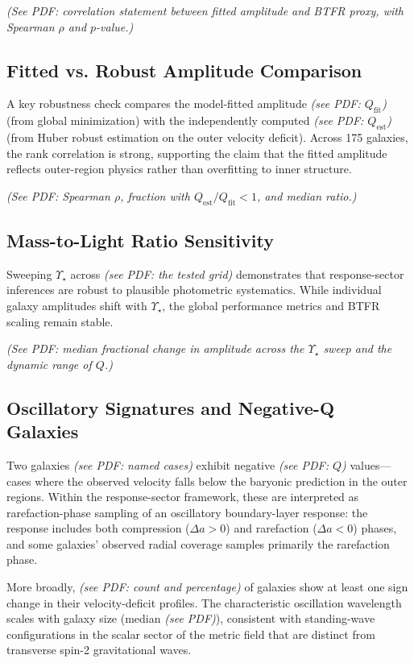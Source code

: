 \emph{(See PDF: correlation statement between fitted amplitude and BTFR proxy, with Spearman $\rho$ and $p$-value.)}

\subsection{Fitted vs. Robust Amplitude Comparison}
A key robustness check compares the model-fitted amplitude \emph{(see PDF: $Q_{\mathrm{fit}}$)} (from global minimization) with the independently computed \emph{(see PDF: $Q_{\mathrm{est}}$)} (from Huber robust estimation on the outer velocity deficit). Across 175 galaxies, the rank correlation is strong, supporting the claim that the fitted amplitude reflects outer-region physics rather than overfitting to inner structure.

\emph{(See PDF: Spearman $\rho$, fraction with $Q_{\mathrm{est}}/Q_{\mathrm{fit}} < 1$, and median ratio.)}

\subsection{Mass-to-Light Ratio Sensitivity}
Sweeping $\Upsilon_\star$ across \emph{(see PDF: the tested grid)} demonstrates that response-sector inferences are robust to plausible photometric systematics. While individual galaxy amplitudes shift with $\Upsilon_\star$, the global performance metrics and BTFR scaling remain stable.

\emph{(See PDF: median fractional change in amplitude across the $\Upsilon_\star$ sweep and the dynamic range of $Q$.)}

\subsection{Oscillatory Signatures and Negative-Q Galaxies}
Two galaxies \emph{(see PDF: named cases)} exhibit negative \emph{(see PDF: $Q$)} values---cases where the observed velocity falls below the baryonic prediction in the outer regions. Within the response-sector framework, these are interpreted as rarefaction-phase sampling of an oscillatory boundary-layer response: the response includes both compression ($\Delta a > 0$) and rarefaction ($\Delta a < 0$) phases, and some galaxies' observed radial coverage samples primarily the rarefaction phase.

More broadly, \emph{(see PDF: count and percentage)} of galaxies show at least one sign change in their velocity-deficit profiles. The characteristic oscillation wavelength scales with galaxy size (median \emph{(see PDF)}), consistent with standing-wave configurations in the scalar sector of the metric field that are distinct from transverse spin-2 gravitational waves.
